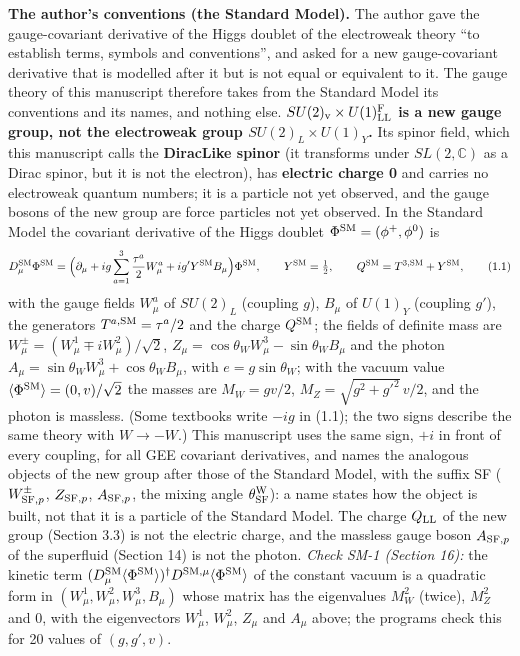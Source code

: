 \documentclass[
  10pt,
]{article}
\begin{document}
\textbf{The author's conventions (the Standard Model).} The author gave
the gauge-covariant derivative of the Higgs doublet of the electroweak
theory ``to establish terms, symbols and conventions'', and asked for a
new gauge-covariant derivative that is modelled after it but is not
equal or equivalent to it. The gauge theory of this manuscript therefore
takes from the Standard Model its conventions and its names, and nothing
else. \textbf{\(SU(2)_{\rm v}\times U(1)^{\rm F}_{\rm LL}\) is a new
gauge group, not the electroweak group \(SU(2)_L\times U(1)_Y\).} Its
spinor field, which this manuscript calls the \textbf{DiracLike spinor}
(it transforms under \(SL(2,\mathbb C)\) as a Dirac spinor, but it is
not the electron), has \textbf{electric charge 0} and carries no
electroweak quantum numbers; it is a particle not yet observed, and the
gauge bosons of the new group are force particles not yet observed. In
the Standard Model the covariant derivative of the Higgs doublet
\(\Phi^{\rm SM}=(\phi^+,\phi^0)\) is
\[D^{\rm SM}_\mu\Phi^{\rm SM}=\Big(\partial_\mu+ig\sum_{a=1}^3\frac{\tau^a}2W^a_\mu+ig'Y^{\rm SM}B_\mu\Big)\Phi^{\rm SM},\qquad Y^{\rm SM}=\tfrac12,\qquad Q^{\rm SM}=T^{3,{\rm SM}}+Y^{\rm SM},\tag{1.1}\]
with the gauge fields \(W^a_\mu\) of \(SU(2)_L\) (coupling \(g\)),
\(B_\mu\) of \(U(1)_Y\) (coupling \(g'\)), the generators
\(T^{a,{\rm SM}}=\tau^a/2\) and the charge \(Q^{\rm SM}\); the fields of
definite mass are \(W^\pm_\mu=(W^1_\mu\mp iW^2_\mu)/\sqrt2\),
\(Z_\mu=\cos\theta_WW^3_\mu-\sin\theta_WB_\mu\) and the photon
\(A_\mu=\sin\theta_WW^3_\mu+\cos\theta_WB_\mu\), with
\(e=g\sin\theta_W\); with the vacuum value
\(\langle\Phi^{\rm SM}\rangle=(0,v)/\sqrt2\) the masses are
\(M_W=gv/2\), \(M_Z=\sqrt{g^2+g'^2}\,v/2\), and the photon is massless.
(Some textbooks write \(-ig\) in (1.1); the two signs describe the same
theory with \(W\to-W\).) This manuscript uses the same sign, \(+i\) in
front of every coupling, for all GEE covariant derivatives, and names
the analogous objects of the new group after those of the Standard
Model, with the suffix SF (\(W^\pm_{{\rm SF},p}\), \(Z_{{\rm SF},p}\),
\(A_{{\rm SF},p}\), the mixing angle \(\theta^{\rm W}_{\rm SF}\)): a
name states how the object is built, not that it is a particle of the
Standard Model. The charge \(Q_{\rm LL}\) of the new group (Section 3.3)
is not the electric charge, and the massless gauge boson
\(A_{{\rm SF},p}\) of the superfluid (Section 14) is not the photon.
\emph{Check SM-1 (Section 16):} the kinetic term
\((D^{\rm SM}_\mu\langle\Phi^{\rm SM}\rangle)^\dagger D^{{\rm SM},\mu}\langle\Phi^{\rm SM}\rangle\)
of the constant vacuum is a quadratic form in
\((W^1_\mu,W^2_\mu,W^3_\mu,B_\mu)\) whose matrix has the eigenvalues
\(M_W^2\) (twice), \(M_Z^2\) and \(0\), with the eigenvectors
\(W^1_\mu\), \(W^2_\mu\), \(Z_\mu\) and \(A_\mu\) above; the programs
check this for 20 values of \((g,g',v)\).
\end{document}
